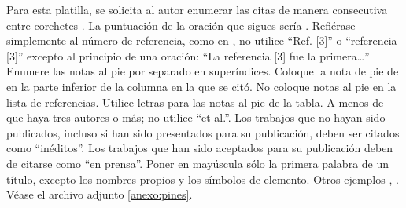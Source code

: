         Para esta platilla, se solicita al autor enumerar las citas de manera consecutiva entre corchetes \cite{YLi2013}. 
        La puntuación de la oración que sigues sería \cite{Mesaelides2011}. 
        Refiérase simplemente al número de referencia, como en \cite{Morales2012}, no utilice “Ref. [3]” o “referencia [3]” excepto al principio de una oración: “La referencia [3] fue la primera…”
        Enumere las notas al pie por separado en superíndices. Coloque la nota de pie de en la parte inferior de la columna en la que se citó. No coloque notas al pie en la lista de referencias. Utilice letras para las notas al pie de la tabla.
        A menos de que haya tres autores o más; no utilice “et al.”. Los trabajos que no hayan sido publicados, incluso si han sido presentados para su publicación, deben ser citados como “inéditos”. Los trabajos que han sido aceptados para su publicación deben de citarse como “en prensa”. Poner en mayúscula sólo la primera palabra de un título, excepto los nombres propios y los símbolos de elemento. 
        Otros ejemplos \cite{LAAngeles2021}, \cite{LAAngelesConni}. 
        Véase el archivo adjunto \ref{anexo:pines}.
        
        
        
        
        
